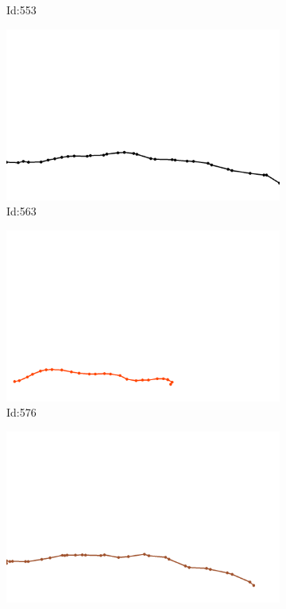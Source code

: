 \documentclass[12pt,twoside]{report}
\begin{document}
\begin{figure}
\begin{subfigure}[b]{0.20\textwidth}
\caption{Id:553}
\end{subfigure}
\begin{subfigure}[b]{0.20\textwidth}
\centering
\includegraphics[width=\textwidth]{../trajectories/563.png}
\caption{Id:563}
\end{subfigure}
\begin{subfigure}[b]{0.20\textwidth}
\centering
\includegraphics[width=\textwidth]{../trajectories/576.png}
\caption{Id:576}
\end{subfigure}
\begin{subfigure}[b]{0.20\textwidth}
\centering
\includegraphics[width=\textwidth]{../trajectories/614.png}

\end{subfigure}
\end{figure}
\end{document}
